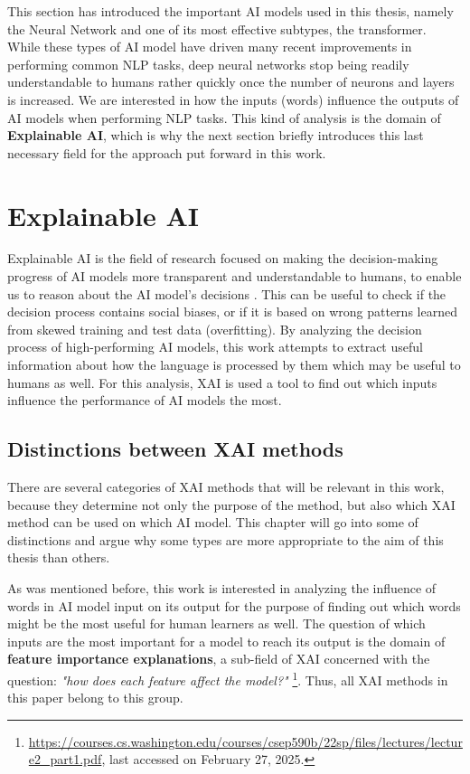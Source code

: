 This section has introduced the important AI models used in this thesis, namely the Neural Network and one of its most effective subtypes, the transformer.
While these types of AI model have driven many recent improvements in performing common NLP tasks, deep neural networks stop being readily understandable to humans rather quickly once the number of neurons and layers is increased.
We are interested in how the inputs (words) influence the outputs of AI models when performing NLP tasks.
This kind of analysis is the domain of \textbf{Explainable AI}, which is why the next section briefly introduces this last necessary field for the approach put forward in this work.

\section{Explainable AI} \label{sec:explainable-ai}
Explainable AI is the field of research focused on making the decision-making progress of AI models more transparent and understandable to humans, to enable us to reason about the AI model's decisions \cite{viloneNotionsExplainabilityEvaluation2021}.
This can be useful to check if the decision process contains social biases, or if it is based on wrong patterns learned from skewed training and test data (overfitting).
By analyzing the decision process of high-performing AI models, this work attempts to extract useful information about how the language is processed by them which may be useful to humans as well.
For this analysis, XAI is used a tool to find out which inputs influence the performance of AI models the most.

\subsection{Distinctions between XAI methods}
There are several categories of XAI methods that will be relevant in this work, because they determine not only the purpose of the method, but also which XAI method can be used on which AI model.
This chapter will go into some of distinctions and argue why some types are more appropriate to the aim of this thesis than others.

As was mentioned before, this work is interested in analyzing the influence of words in AI model input on its output for the purpose of finding out which words might be the most useful for human learners as well.
The question of which inputs are the most important for a model to reach its output is the domain of \textbf{feature importance explanations}, a sub-field of XAI concerned with the question: \textit{"how does each feature affect the model?"} \footnote{\url{https://courses.cs.washington.edu/courses/csep590b/22sp/files/lectures/lecture2_part1.pdf}, last accessed on February 27, 2025.}.
Thus, all XAI methods in this paper belong to this group.

